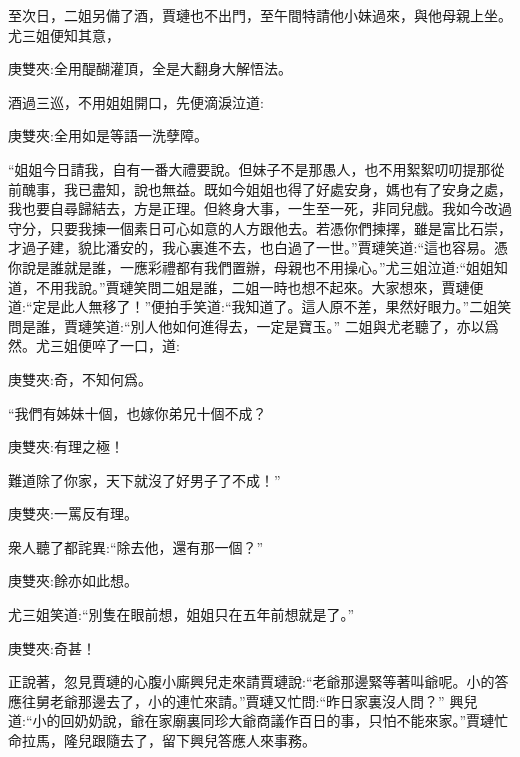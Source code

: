 \begin{parag}
    至次日，二姐另備了酒，賈璉也不出門，至午間特請他小妹過來，與他母親上坐。尤三姐便知其意，\begin{note}庚雙夾:全用醍醐灌頂，全是大翻身大解悟法。\end{note}酒過三巡，不用姐姐開口，先便滴淚泣道:\begin{note}庚雙夾:全用如是等語一洗孽障。\end{note}“姐姐今日請我，自有一番大禮要說。但妹子不是那愚人，也不用絮絮叨叨提那從前醜事，我已盡知，說也無益。既如今姐姐也得了好處安身，媽也有了安身之處，我也要自尋歸結去，方是正理。但終身大事，一生至一死，非同兒戲。我如今改過守分，只要我揀一個素日可心如意的人方跟他去。若憑你們揀擇，雖是富比石崇，才過子建，貌比潘安的，我心裏進不去，也白過了一世。”賈璉笑道:“這也容易。憑你說是誰就是誰，一應彩禮都有我們置辦，母親也不用操心。”尤三姐泣道:“姐姐知道，不用我說。”賈璉笑問二姐是誰，二姐一時也想不起來。大家想來，賈璉便道:“定是此人無移了！”便拍手笑道:“我知道了。這人原不差，果然好眼力。”二姐笑問是誰，賈璉笑道:“別人他如何進得去，一定是寶玉。” 二姐與尤老聽了，亦以爲然。尤三姐便啐了一口，道:\begin{note}庚雙夾:奇，不知何爲。\end{note}“我們有姊妹十個，也嫁你弟兄十個不成？\begin{note}庚雙夾:有理之極！\end{note}難道除了你家，天下就沒了好男子了不成！”\begin{note}庚雙夾:一罵反有理。\end{note}衆人聽了都詫異:“除去他，還有那一個？”\begin{note}庚雙夾:餘亦如此想。\end{note}尤三姐笑道:“別隻在眼前想，姐姐只在五年前想就是了。”\begin{note}庚雙夾:奇甚！\end{note}
\end{parag}


\begin{parag}
    正說著，忽見賈璉的心腹小廝興兒走來請賈璉說:“老爺那邊緊等著叫爺呢。小的答應往舅老爺那邊去了，小的連忙來請。”賈璉又忙問:“昨日家裏沒人問？” 興兒道:“小的回奶奶說，爺在家廟裏同珍大爺商議作百日的事，只怕不能來家。”賈璉忙命拉馬，隆兒跟隨去了，留下興兒答應人來事務。
\end{parag}


